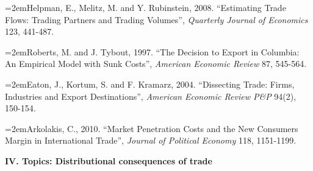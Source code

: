 \documentclass[10pt]{article}
\newcommand{\reading}{\par\hangindent=2em\hangafter=1\noindent}
\newenvironment{readingsblock}{%
  \begin{adjustwidth}{2em}{0pt} %
}{%
  \end{adjustwidth}
}
\begin{document}
\begin{readingsblock}
  \reading Helpman, E., Melitz, M. and Y. Rubinstein, 2008. “Estimating Trade Flows: Trading Partners and Trading Volumes”, {\it Quarterly Journal of Economics} 123, 441-487.
  
  \reading Roberts, M. and J. Tybout, 1997. “The Decision to Export in Columbia: An Empirical Model with Sunk Costs”, {\it American Economic Review} 87, 545-564.
  
  \reading Eaton, J., Kortum, S. and F. Kramarz, 2004. “Dissecting Trade: Firms, Industries and Export Destinations”, {\it American Economic Review P\&P}  94(2), 150-154.
  
  \reading Arkolakis, C., 2010. “Market Penetration Costs and the New Consumers Margin in International Trade”, {\it Journal of Political Economy} 118, 1151-1199. \\[4pt]
  
  \end{readingsblock}
  
  
\noindent \textbf{IV. Topics: Distributional consequences of trade} \\[6pt]
\end{document}
